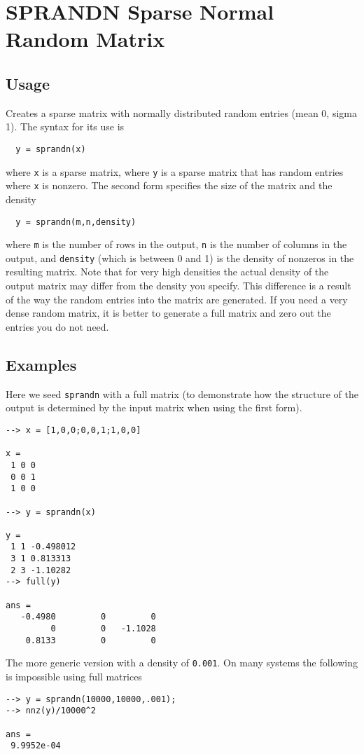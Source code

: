 \section{SPRANDN Sparse Normal Random Matrix}

\subsection{Usage}

Creates a sparse matrix with normally distributed random entries (mean 0, sigma 1).  The
syntax for its use is
\begin{verbatim}
  y = sprandn(x)
\end{verbatim}
where \verb|x| is a sparse matrix, where \verb|y| is a sparse matrix that has
random entries where \verb|x| is nonzero.  The second form specifies the
size of the matrix and the density
\begin{verbatim}
  y = sprandn(m,n,density)
\end{verbatim}
where \verb|m| is the number of rows in the output, \verb|n| is the number of 
columns in the output, and \verb|density| (which is between 0 and 1) is
the density of nonzeros in the resulting matrix.  Note that for very
high densities the actual density of the output matrix may differ from
the density you specify.  This difference is a result of the way the
random entries into the matrix are generated.  If you need a very dense
random matrix, it is better to generate a full matrix and zero out the 
entries you do not need.
\subsection{Examples}

Here we seed \verb|sprandn| with a full matrix (to demonstrate how the structure
of the output is determined by the input matrix when using the first form).
\begin{verbatim}
--> x = [1,0,0;0,0,1;1,0,0]

x = 
 1 0 0 
 0 0 1 
 1 0 0 

--> y = sprandn(x)

y = 
 1 1 -0.498012
 3 1 0.813313
 2 3 -1.10282
--> full(y)

ans = 
   -0.4980         0         0 
         0         0   -1.1028 
    0.8133         0         0 
\end{verbatim}
The more generic version with a density of \verb|0.001|.  On many systems the
following is impossible using full matrices
\begin{verbatim}
--> y = sprandn(10000,10000,.001);
--> nnz(y)/10000^2

ans = 
 9.9952e-04 
\end{verbatim}
